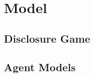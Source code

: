 \section{Model}
\label{sec:model}

\subsection{Disclosure Game}
\label{sub:the_game}

\subsection{Agent Models}
\label{sub:the_agents}
